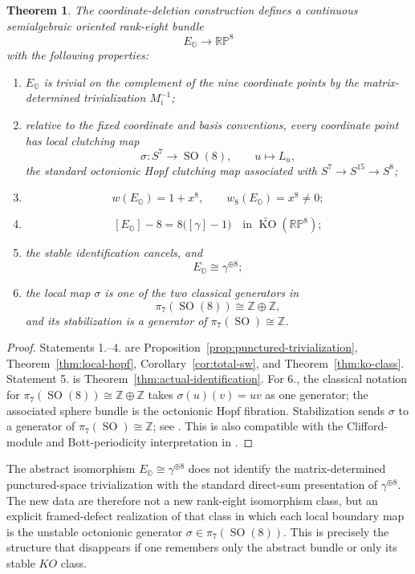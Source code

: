 \documentclass[12pt]{article}
\theoremstyle{plain}
\newtheorem{theorem}{Theorem}[section]
\theoremstyle{definition}
\newcommand{\Oct}{\mathbb O}
\newcommand{\RP}{\mathbb{RP}}
\newcommand{\SO}{\operatorname{SO}}
\newcommand{\KO}{\operatorname{KO}}
\begin{document}
\begin{theorem}
	\label{thm:octonionic}
	The coordinate-deletion construction defines a continuous
	semialgebraic oriented rank-eight bundle
	\[
	E_{\Oct}\longrightarrow\RP^8
	\]
	with the following properties:
	\begin{enumerate}
		\item $E_{\Oct}$ is trivial on the complement of the nine coordinate
		points by the matrix-determined trivialization $M_i^{-1}$;
		\item relative to the fixed coordinate and basis conventions, every
		coordinate point has local clutching map
		\[
		\sigma:S^7\longrightarrow\SO(8),\qquad u\longmapsto L_u,
		\]
		the standard octonionic Hopf clutching map associated with
		$S^7\to S^{15}\to S^8$;
		\item
		\[
		w(E_{\Oct})=1+x^8,
		\qquad w_8(E_{\Oct})=x^8\ne0;
		\]
		\item
		\[
		[E_{\Oct}]-8=8\bigl([\gamma]-1\bigr)
		\quad\text{in }\widetilde{\KO}(\RP^8);
		\]
		\item the stable identification cancels, and
		\[
		E_{\Oct}\cong\gamma^{\oplus8};
		\]
		\item the local map $\sigma$ is one of the two classical generators in
		\[
		\pi_7(\SO(8))\cong\mathbb Z\oplus\mathbb Z,
		\]
		and its stabilization is a generator of
		$\pi_7(\SO)\cong\mathbb Z$.
	\end{enumerate}
\end{theorem}

\begin{proof}
	Statements 1.--4. are
	Proposition~\ref{prop:punctured-trivialization},
	Theorem~\ref{thm:local-hopf}, Corollary~\ref{cor:total-sw}, and
	Theorem~\ref{thm:ko-class}. Statement 5. is
	Theorem~\ref{thm:actual-identification}. For 6., the classical
	notation for $\pi_7(\SO(8))\cong\mathbb Z\oplus\mathbb Z$ takes
	$\sigma(u)(v)=uv$ as one generator; the associated sphere bundle is the octonionic Hopf
	fibration. Stabilization sends $\sigma$ to a generator of
	$\pi_7(\SO)\cong\mathbb Z$; see
	\cite{CardimLamMelloRandall}. This is also compatible with the
	Clifford-module and Bott-periodicity interpretation in
	\cite{ABS,Baez}.
\end{proof}

The abstract isomorphism $E_{\Oct}\cong\gamma^{\oplus8}$ does not
identify the matrix-determined punctured-space trivialization with the
standard direct-sum presentation of $\gamma^{\oplus8}$. The new data
are therefore not a new rank-eight isomorphism class, but an explicit
framed-defect realization of that class in which each local boundary
map is the unstable octonionic generator $\sigma\in\pi_7(\SO(8))$.
This is precisely the structure that disappears if one remembers only
the abstract bundle or only its stable $KO$ class.
\end{document}

